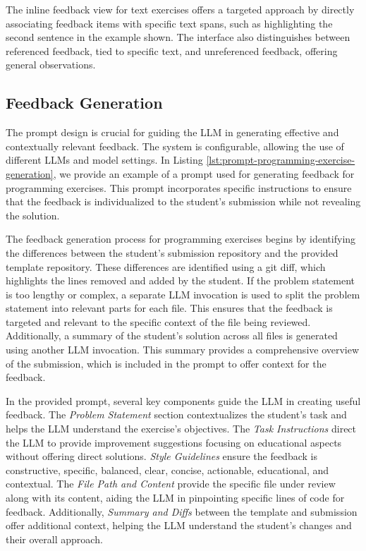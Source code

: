 \documentclass[sigconf,screen,review,anonymous]{acmart}
\begin{document}
The inline feedback view for text exercises offers a targeted approach by directly associating feedback items with specific text spans, such as highlighting the second sentence in the example shown.
The interface also distinguishes between referenced feedback, tied to specific text, and unreferenced feedback, offering general observations.


\subsection{Feedback Generation}

The prompt design is crucial for guiding the LLM in generating effective and contextually relevant feedback.
The system is configurable, allowing the use of different LLMs and model settings. 
In Listing \ref{lst:prompt-programming-exercise-generation}, we provide an example of a prompt used for generating feedback for programming exercises. 
This prompt incorporates specific instructions to ensure that the feedback is individualized to the student's submission while not revealing the solution.

The feedback generation process for programming exercises begins by identifying the differences between the student's submission repository and the provided template repository. 
These differences are identified using a git diff, which highlights the lines removed and added by the student. 
If the problem statement is too lengthy or complex, a separate LLM invocation is used to split the problem statement into relevant parts for each file. 
This ensures that the feedback is targeted and relevant to the specific context of the file being reviewed. 
Additionally, a summary of the student's solution across all files is generated using another LLM invocation. 
This summary provides a comprehensive overview of the submission, which is included in the prompt to offer context for the feedback.

In the provided prompt, several key components guide the LLM in creating useful feedback. The \textit{Problem Statement} section contextualizes the student's task and helps the LLM understand the exercise's objectives.
The \textit{Task Instructions} direct the LLM to provide improvement suggestions focusing on educational aspects without offering direct solutions.
\textit{Style Guidelines} ensure the feedback is constructive, specific, balanced, clear, concise, actionable, educational, and contextual.
The \textit{File Path and Content} provide the specific file under review along with its content, aiding the LLM in pinpointing specific lines of code for feedback.
Additionally, \textit{Summary and Diffs} between the template and submission offer additional context, helping the LLM understand the student's changes and their overall approach.
\end{document}
